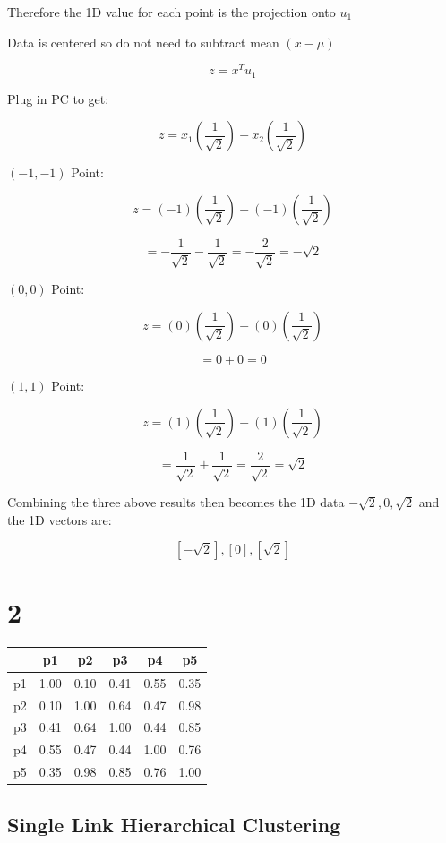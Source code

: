 \documentclass[11pt]{article}
\begin{document}
Therefore the 1D value for each point is the projection onto $u_1$

Data is centered so do not need to subtract mean $(x - \mu)$

\[
z = x^T u_1
\]

Plug in PC to get:

\[
z = x_1 \left(\frac{1}{\sqrt{2}}\right) + x_2 \left(\frac{1}{\sqrt{2}}\right)
\]

$(-1, -1)$ Point:

\[
z = (-1)\left(\frac{1}{\sqrt{2}}\right) + (-1)\left(\frac{1}{\sqrt{2}}\right)
\]

\[
= -\frac{1}{\sqrt{2}} - \frac{1}{\sqrt{2}} = -\frac{2}{\sqrt{2}} = -\sqrt{2}
\]

$(0, 0)$ Point:

\[
z = (0)\left(\frac{1}{\sqrt{2}}\right) + (0)\left(\frac{1}{\sqrt{2}}\right)
\]

\[
= 0 + 0 = 0
\]

$(1, 1)$ Point:

\[
z = (1)\left(\frac{1}{\sqrt{2}}\right) + (1)\left(\frac{1}{\sqrt{2}}\right)
\]

\[
= \frac{1}{\sqrt{2}} + \frac{1}{\sqrt{2}} = \frac{2}{\sqrt{2}} = \sqrt{2}
\]

Combining the three above results then becomes the 1D data $-\sqrt{2}, 0, \sqrt{2}$ and the 1D vectors are:

\[
[-\sqrt{2}], [0], [\sqrt{2}]
\]

\section*{2}

\begin{tabular}{c|ccccc}
 & p1 & p2 & p3 & p4 & p5 \\
\hline
p1 & 1.00 & 0.10 & 0.41 & 0.55 & 0.35 \\
p2 & 0.10 & 1.00 & 0.64 & 0.47 & 0.98 \\
p3 & 0.41 & 0.64 & 1.00 & 0.44 & 0.85 \\
p4 & 0.55 & 0.47 & 0.44 & 1.00 & 0.76 \\
p5 & 0.35 & 0.98 & 0.85 & 0.76 & 1.00 \\
\end{tabular}

\subsection*{Single Link Hierarchical Clustering}
\end{document}
